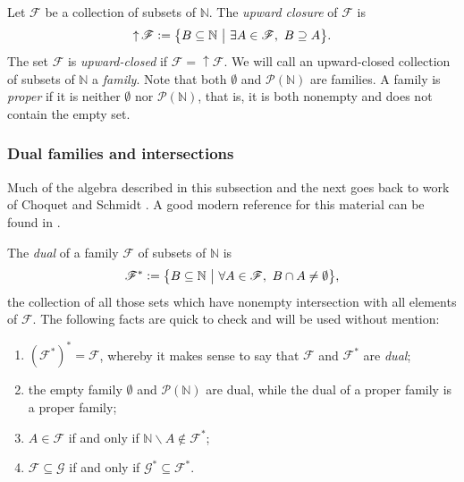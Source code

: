 \documentclass[letter,11pt]{article}
\theoremstyle{plain}
\theoremstyle{definition}
\theoremstyle{plain}
\theoremstyle{plain}
\numberwithin{equation}{section}
\newcommand{\N}{\mathbb{N}}
\newcommand{\defeq}{\vcentcolon=}
\renewcommand{\setminus}{\backslash}
\DeclareMathOperator{\upclose}{\uparrow}
\newcommand{\class}{\mathscr{F}}
\newcommand{\family}{\mathscr{F}}
\newcommand{\familytwo}{\mathscr{G}}
\begin{document}
Let $\class$ be a collection of subsets of $\N$.  The \emph{upward closure} of $\class$ is
\[\upclose \class \defeq \big\{ B \subseteq \N \ \big| \ \exists A \in \class, \ B \supseteq A \big\}.\]
The set $\class$ is \emph{upward-closed} if $\class = \upclose \class$.  We will call an upward-closed collection of subsets of $\N$ a \emph{family}.  Note that both $\emptyset$ and $\mathcal{P}(\N)$ are families.  A family is \emph{proper} if it is neither $\emptyset$ nor $\mathcal{P}(\N)$, that is, it is both nonempty and does not contain the empty set.

\subsubsection{Dual families and intersections}
\label{sec_dual_families}

Much of the algebra described in this subsection and the next goes back to work of Choquet \cite{choquet_1947} and Schmidt \cite{schmidt_1952,schmidt_1953}.  A good modern reference for this material can be found in \cite[Section 2]{christopherson_johnson_2022}.

The \emph{dual} of a family $\family$ of subsets of $\N$ is
\[\family^* \defeq \big\{ B \subseteq \N \ \big | \ \forall A \in \family, \ B \cap A \neq \emptyset \big\},\]
the collection of all those sets which have nonempty intersection with all elements of $\family$.  The following facts are quick to check and will be used without mention:
\begin{enumerate}
    \item $(\family^*)^* = \family$, whereby it makes sense to say that $\family$ and $\family^*$ are \emph{dual};
    \item the empty family $\emptyset$ and $\mathcal{P}(\N)$ are dual, while the dual of a proper family is a proper family;
    \item $A \in \family$ if and only if $\N \setminus A \not\in \family^*$;
    \item $\family \subseteq \familytwo$ if and only if $\familytwo^* \subseteq \family^*$.\\
\end{enumerate}
\end{document}
